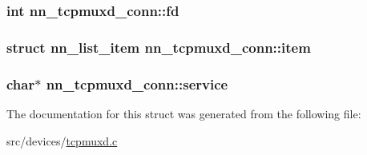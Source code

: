 \subsubsection[{fd}]{\setlength{\rightskip}{0pt plus 5cm}int nn\+\_\+tcpmuxd\+\_\+conn\+::fd}\hypertarget{structnn__tcpmuxd__conn_a67ce1fec41d416d7d2745e5c6adcfdbd}{}\label{structnn__tcpmuxd__conn_a67ce1fec41d416d7d2745e5c6adcfdbd}
\subsubsection[{item}]{\setlength{\rightskip}{0pt plus 5cm}struct {\bf nn\+\_\+list\+\_\+item} nn\+\_\+tcpmuxd\+\_\+conn\+::item}\hypertarget{structnn__tcpmuxd__conn_a8bef328043430d10ea02a12d4b91b095}{}\label{structnn__tcpmuxd__conn_a8bef328043430d10ea02a12d4b91b095}
\subsubsection[{service}]{\setlength{\rightskip}{0pt plus 5cm}char$\ast$ nn\+\_\+tcpmuxd\+\_\+conn\+::service}\hypertarget{structnn__tcpmuxd__conn_a94fa92e87e6ef2efa20ca97dc5f66052}{}\label{structnn__tcpmuxd__conn_a94fa92e87e6ef2efa20ca97dc5f66052}


The documentation for this struct was generated from the following file\+:\begin{DoxyCompactItemize}
\item 
src/devices/\hyperlink{tcpmuxd_8c}{tcpmuxd.\+c}\end{DoxyCompactItemize}
